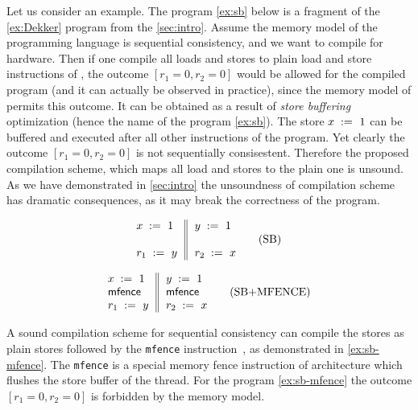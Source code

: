 Let us consider an example. 
The program \ref{ex:sb} below is a 
fragment of the \ref{ex:Dekker} program 
from the \cref{sec:intro}.
Assume the memory model of the programming language
is sequential consistency, and we want 
to compile for \xTSO hardware. 
Then if one compile all loads and stores 
to plain load and store instructions of \xTSO,
the outcome $[r_1=0, r_2=0]$ would be 
allowed for the compiled program 
(and it can actually be observed in practice), 
since the memory model of \xTSO permits this outcome. 
It can be obtained as a result of \emph{store buffering}
optimization (hence the name of the program \ref{ex:sb}). 
The store $x\;:=_{}\;1$ can be buffered and 
executed after all other instructions of the program.  
Yet clearly the outcome $[r_1=0, r_2=0]$ is not sequentially consisestent. 
Therefore the proposed compilation scheme, 
which maps all load and stores to the plain one is unsound. 
As we have demonstrated in \cref{sec:intro} 
the unsoundness of compilation scheme has 
dramatic consequences, as it may break 
the correctness of the program. 

\begin{minipage}{0.45\linewidth}
\begin{equation*}
\inarrII{
   \writeInst{}{x}{1}   \\
   \emptyInst           \\
   \readInst{}{r_1}{y}  \\
}{
  \writeInst{}{y}{1}   \\
  \emptyInst           \\
  \readInst{}{r_2}{x}  \\
}
\tag{SB}\label{ex:sb}
\end{equation*}
\end{minipage}\hfill%
\begin{minipage}{0.45\linewidth}
\begin{equation*}
\inarrII{
   \writeInst{}{x}{1}   \\
   \mfenceInst          \\
   \readInst{}{r_1}{y}  \\
}{
  \writeInst{}{y}{1}   \\
  \mfenceInst          \\
  \readInst{}{r_2}{x}  \\
}
\tag{SB+MFENCE}\label{ex:sb-mfence}
\end{equation*}
\end{minipage}

A sound compilation scheme for sequential consistency 
can compile the stores as plain stores followed 
by the \texttt{mfence} instruction~\cite{Sewell-al:CACM10, Batty-al:POPL11}, 
as demonstrated in \ref{ex:sb-mfence}. 
The \texttt{mfence} is a special memory fence instruction
of \xTSO architecture which flushes the store buffer of the thread. 
For the program \ref{ex:sb-mfence} the outcome $[r_1=0, r_2=0]$
is forbidden by the \xTSO memory model. 

